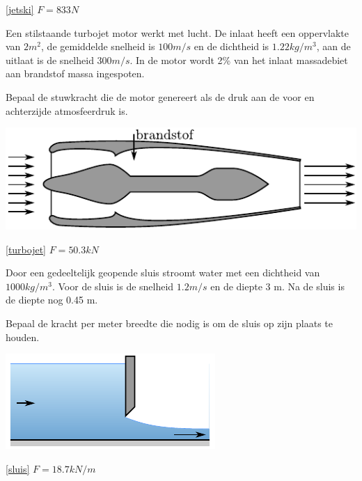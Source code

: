 \begin{antwoord}{\ref{jetski}}
	$F = 833 \unit{N}$
\end{antwoord}
\begin{toepassing}
	\label{turbojet}
Een stilstaande turbojet motor werkt met lucht. De inlaat heeft een oppervlakte van $2 \unit{m^2}$, de gemiddelde snelheid is $100 \unit{m/s}$ en de dichtheid is $1.22 \unit{kg/m^3}$, aan de uitlaat is de snelheid $300 \unit{m/s}$. In de motor wordt 2\% van het inlaat massadebiet aan brandstof massa ingespoten.

Bepaal de stuwkracht die de motor genereert als de druk aan de voor en achterzijde atmosfeerdruk is.

	\centering
	\includegraphics{fig/behoudsvergelijkingen/turbojet}
\end{toepassing}
\begin{antwoord}{\ref{turbojet}}
	$F = 50.3 \unit{kN}$
\end{antwoord}
\begin{toepassing}
	\label{sluis}
Door een gedeeltelijk geopende sluis stroomt water met een dichtheid van $1000 \unit{kg/m^3}$. Voor de sluis is de snelheid $1.2 \unit{m/s}$ en de diepte 3 m. Na de sluis is de diepte nog 0.45 m.

Bepaal de kracht per meter breedte die nodig is om de sluis op zijn plaats te houden.

	\centering
	\includegraphics{fig/behoudsvergelijkingen/sluis}
\end{toepassing}
\begin{antwoord}{\ref{sluis}}
	$F = 18.7 \unit{kN/m}$
\end{antwoord}
